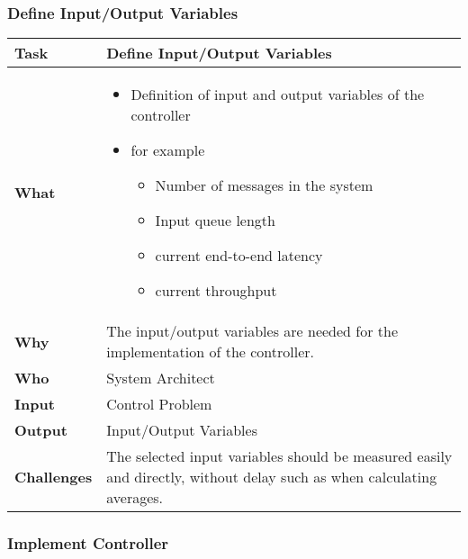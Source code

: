 \subsubsection{Define Input/Output Variables}

\begin{tabularx}{\textwidth}{@{} l X @{}}
	\caption{Define Input/Output Variables} \label{table:ch6_Task_Define_Controller_Variables}\\
	\toprule 
	\bfseries Task & Define Input/Output Variables\\
	\midrule 
	\bfseries What &
	\begin{itemize}
		\item Definition of input and output variables of the controller
		\item for example
		\begin{itemize}
			\item Number of messages in the system
			\item Input queue length
			\item current end-to-end latency
			\item current throughput
		\end{itemize}
	\end{itemize}
	\\
	\midrule 
	\bfseries Why & The input/output variables are needed for the implementation of the controller.\\
	\midrule 
	\bfseries Who & System Architect\\
	\midrule 
	\bfseries Input & Control Problem\\
	\midrule 
	\bfseries Output & Input/Output Variables\\
	\midrule 
	\bfseries Challenges & The selected input variables should be measured easily and directly, without delay such as when calculating averages.\\
	\bottomrule 
\end{tabularx}


\subsubsection{Implement Controller}

